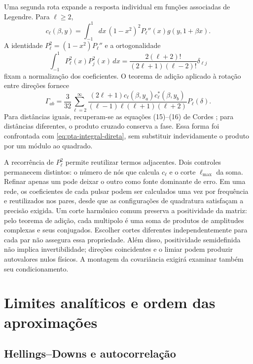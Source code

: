 Uma segunda rota expande a resposta individual em funções associadas
de Legendre. Para \(\ell\geq2\),
\begin{equation}
 c_\ell(\beta,y)=\int_{-1}^{1}dx\,
     (1-x^2)^2P_\ell''(x)g(y,1+\beta x).
 \label{eq:pta-coeficientes}
\end{equation}
A identidade \(P_\ell^2=(1-x^2)P_\ell''\) e a ortogonalidade
\begin{equation}
 \int_{-1}^{1}P_\ell^2(x)P_j^2(x)\,dx
 =\frac{2(\ell+2)!}{(2\ell+1)(\ell-2)!}\delta_{\ell j}
 \label{eq:pta-ortogonalidade}
\end{equation}
fixam a normalização dos coeficientes. O teorema de adição aplicado à
rotação entre direções fornece
\begin{equation}
 \Gamma_{ab}=\frac3{32}\sum_{\ell=2}^{\infty}
 \frac{(2\ell+1)c_\ell(\beta,y_a)c_\ell^*(\beta,y_b)}
 { (\ell-1)\ell(\ell+1)(\ell+2)}P_\ell(\delta).
 \label{eq:pta-serie-harmonica}
\end{equation}
Para distâncias iguais, recuperam-se as equações (15)--(16) de
Cordes \autocite{cordes2025}; para
distâncias diferentes, o produto cruzado conserva a fase. Essa forma
foi confrontada com \eqref{eq:pta-integral-direta}, sem substituir
indevidamente o produto por um módulo ao quadrado.

A recorrência de \(P_\ell^2\) permite reutilizar termos adjacentes.
Dois controles permanecem distintos: o número de nós que calcula
\(c_\ell\) e o corte \(\ell_{\max}\) da soma. Refinar apenas
um pode deixar o outro como fonte dominante de erro. Em uma rede,
os coeficientes de cada pulsar podem ser calculados uma vez por
frequência e reutilizados nos pares, desde que as configurações de
quadratura satisfaçam a precisão exigida.
Um corte harmônico comum preserva a positividade da matriz: pelo
teorema de adição, cada multipolo é uma soma de produtos de
amplitudes complexas e seus conjugados. Escolher cortes diferentes
independentemente para cada par não assegura essa propriedade.
Além disso, positividade semidefinida não implica invertibilidade;
direções coincidentes e o limiar podem produzir autovalores nulos
físicos. A montagem da covariância exigirá examinar também seu
condicionamento.

\section{Limites analíticos e ordem das aproximações}

\subsection{Hellings--Downs e autocorrelação}

